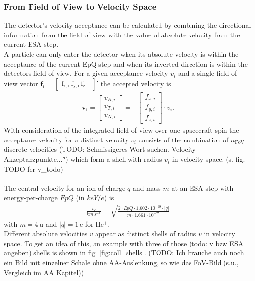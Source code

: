 \subsubsection{From Field of View to Velocity Space}
The detector's velocity acceptance can be calculated by combining the directional information from the field of view with the value of absolute velocity from the current ESA step. 
\\
A particle can only enter the detector when its absolute velocity is within the acceptance of the current EpQ step and when its inverted direction is within the detectors field of view. For a given acceptance velocity $v_i$ and a single field of view vector $\mathrm{\mathbf{f_i} = \begin{bmatrix}f_{x,i}\,f_{y,i}\,f_{z,i}\end{bmatrix}}'$ the accepted velocity is
\begin{align}
\mathbf{v_i} = \begin{bmatrix}v_{R,i}\\v_{T,i}\\v_{N,i}\end{bmatrix} = - \begin{bmatrix}f_{x,i}\\f_{y,i}\\f_{z,i}\end{bmatrix} \cdot v_i.
\label{eq:fov}
\end{align}
With consideration of the integrated field of view over one spacecraft spin the acceptance velocity for a distinct velocity $v_i$ consists of the combination of $n_\mathrm{FoV}$ discrete velocities (TODO: Schmissigeres Wort suchen. Velocity-Akzeptanzpunkte...?) which form a shell with radius $v_i$ in velocity space. (s. fig. TODO for v\_todo)
\\ \\
The central velocity for an ion of charge $q$ and mass $m$ at an ESA step with energy-per-charge $EpQ$ (in $keV/e$) is
\begin{align*}
\frac{v_c}{km \, s^{-1}} = \sqrt{\frac{2 \cdot EpQ \cdot 1.602\cdot10^{-19}\cdot |q|}{m \cdot 1.661 \cdot 10^{-27}} }
\end{align*}
with $m = 4\,\mathrm{u}$ and $|q| = 1\,\mathrm{e}$ for $\mathrm{He^{+}}$.
\\
Different absolute velocities $v$ appear as distinct shells of radius $v$ in velocity space.
To get an idea of this, an example with three of those (todo: v bzw ESA angeben) shells is shown in fig. \ref{fig:coll_shells}. (TODO: Ich brauche auch noch ein Bild mit einzelner Schale ohne AA-Auslenkung, so wie das FoV-Bild (s.u., Vergleich im AA Kapitel))\\
